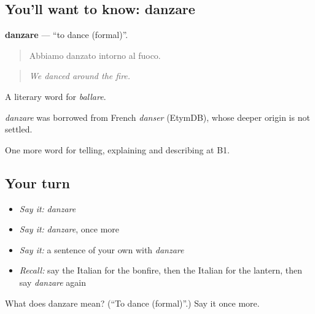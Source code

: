 \subsection*{You'll want to know: danzare}
\textbf{danzare} — \textquotedblleft{}to dance (formal)\textquotedblright{}.

\begin{quote}
Abbiamo danzato intorno al fuoco.
\end{quote}

\begin{quote}
\emph{We danced around the fire.}
\end{quote}

A literary word for \emph{ballare}.

\begin{cousinweb}
\emph{danzare} was borrowed from French \emph{danser} (EtymDB), whose deeper origin is not settled.
\end{cousinweb}

\begin{grammarlens}[title={What you've built}]
One more word for telling, explaining and describing at B1.
\end{grammarlens}

\subsection*{Your turn}
\begin{itemize}
\raggedright
  \item \emph{Say it:} \emph{danzare}
  \item \emph{Say it:} \emph{danzare}, once more
  \item \emph{Say it:} a sentence of your own with \emph{danzare}
  \item \emph{Recall:} say the Italian for the bonfire, then the Italian for the lantern, then say \emph{danzare} again
\end{itemize}

\begin{tcolorbox}[breakable,colback=teal!4,colframe=teal!35!black,title={Before you move on}]
What does danzare mean? (\textquotedblleft{}To dance (formal)\textquotedblright{}.) Say it once more.
\end{tcolorbox}
